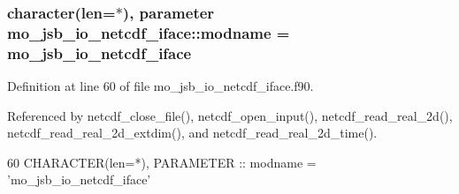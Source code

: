 \subsubsection[{modname}]{\setlength{\rightskip}{0pt plus 5cm}character(len=$\ast$), parameter mo\+\_\+jsb\+\_\+io\+\_\+netcdf\+\_\+iface\+::modname = \textquotesingle{}mo\+\_\+jsb\+\_\+io\+\_\+netcdf\+\_\+iface\textquotesingle{}}\label{namespacemo__jsb__io__netcdf__iface_aa929904f54cf60b8c7c6bc8be31257d0}


Definition at line 60 of file mo\+\_\+jsb\+\_\+io\+\_\+netcdf\+\_\+iface.\+f90.



Referenced by netcdf\+\_\+close\+\_\+file(), netcdf\+\_\+open\+\_\+input(), netcdf\+\_\+read\+\_\+real\+\_\+2d(), netcdf\+\_\+read\+\_\+real\+\_\+2d\+\_\+extdim(), and netcdf\+\_\+read\+\_\+real\+\_\+2d\+\_\+time().


\begin{DoxyCode}
60   \textcolor{keywordtype}{CHARACTER(len=*)}, \textcolor{keywordtype}{PARAMETER} :: modname = \textcolor{stringliteral}{'mo\_jsb\_io\_netcdf\_iface'}
\end{DoxyCode}
